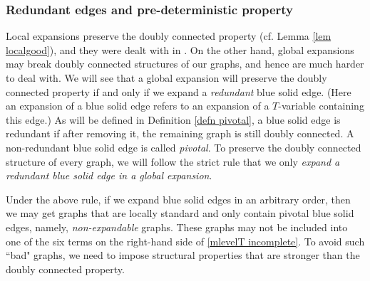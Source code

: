\documentclass{article}
\newcommand{\1}{\mathds{1}}
\numberwithin{equation}{section}
\theoremstyle{plain} %
\theoremstyle{remark}
\newcommand{\cor}{\color{red}}
\newcommand{\hty}[1]{{\cor (ht: #1) }}
\begin{document}
%

\subsubsection{Redundant edges and pre-deterministic property}

Local expansions preserve the doubly connected property (cf. Lemma \ref{lem localgood}), and they were dealt with in \cite{PartI_high}.
On the other hand, global expansions may break doubly connected structures of our graphs, and hence are much harder to deal with. We will see that a global expansion will preserve the doubly connected property if and only if we expand a \emph{redundant} blue solid edge. (Here an expansion of a blue solid edge refers to an expansion of a $T$-variable containing this edge.) As will be defined in Definition \ref{defn pivotal}, a blue solid edge is redundant if after removing it, the remaining graph is still doubly connected. A non-redundant blue solid edge is called \emph{pivotal}. To preserve the doubly connected structure of every graph, we will follow the strict rule that we  only \emph{expand a redundant blue solid edge in a global expansion}. 

Under the above rule, if we expand blue solid edges in an arbitrary order, then we may get graphs that are locally standard and only contain pivotal blue solid edges, namely, \emph{non-expandable} graphs. These graphs may not be included into one of the six terms on the right-hand side of \eqref{mlevelT incomplete}. %
To avoid such ``bad" graphs, we need to impose structural properties that are stronger than the doubly connected property. 
\end{document}
